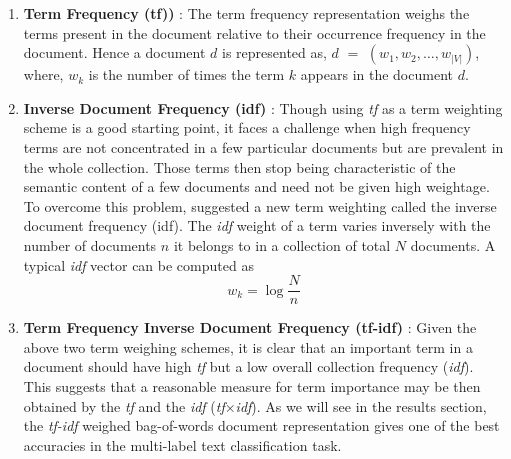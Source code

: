 \begin{enumerate}
\item{\textbf{Term Frequency (tf))} : }The term frequency representation weighs the terms present in the document relative to their occurrence frequency in the document. Hence a document $d$ is represented as, $d$ $=$ $(w_{1}, w_{2}, \ldots, w_{|V|})$, where, $w_{k}$ is the number of times the term $k$ appears in the document $d$. 
\item{\textbf{Inverse Document Frequency (idf)} : }Though using \emph{tf} as a term weighting scheme is a good starting point, it faces a challenge when high frequency terms are not concentrated in a few particular documents but are prevalent in the whole collection. Those terms then stop being characteristic of the semantic content of a few documents and need not be given high weightage. To overcome this problem, \cite{salton1988term} suggested a new term weighting called the inverse document frequency (idf). The \emph{idf} weight of a term varies inversely with the number of documents $n$ it belongs to in a collection of total $N$ documents. A typical \emph{idf} vector can be computed as 
\begin{equation}
w_{k} = \log \frac{N}{n}
\end{equation}
\item{\textbf{Term Frequency Inverse Document Frequency (tf-idf)} : }Given the above two term weighing schemes, it is clear that an important term in a document should have high \emph{tf} but a low overall collection frequency (\emph{idf}). This suggests that a reasonable measure for term importance may be then obtained by the \emph{tf} and the \emph{idf} (\emph{tf}$\times$\emph{idf}). As we will see in the results section, the \emph{tf-idf} weighed bag-of-words document representation gives one of the best accuracies in the multi-label text classification task.
\end{enumerate}

